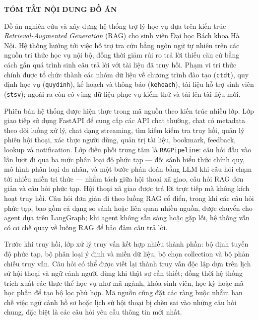 \documentclass[../DoAn.tex]{subfiles}
\begin{document}
\begin{center}
    \Large{\textbf{TÓM TẮT NỘI DUNG ĐỒ ÁN}}\\
\end{center}
\vspace{1cm}

Đồ án nghiên cứu và xây dựng hệ thống trợ lý học vụ dựa trên kiến trúc
\textit{Retrieval-Augmented Generation} (RAG) cho sinh viên Đại học Bách khoa
Hà Nội. Hệ thống hướng tới việc hỗ trợ tra cứu bằng ngôn ngữ tự nhiên trên các
nguồn tri thức học vụ nội bộ, đồng thời giảm rủi ro trả lời thiếu căn cứ bằng
cách gắn quá trình sinh câu trả lời với tài liệu đã truy hồi. Phạm vi tri thức
chính được tổ chức thành các nhóm dữ liệu về chương trình đào tạo
(\texttt{ctdt}), quy định học vụ (\texttt{quydinh}), kế hoạch và thông báo
(\texttt{kehoach}), tài liệu hỗ trợ sinh viên (\texttt{stsv}); ngoài ra còn có
vùng dữ liệu phục vụ kiểm thử và tải lên tài liệu mới.

Phiên bản hệ thống được hiện thực trong mã nguồn theo kiến trúc nhiều lớp. Lớp
giao tiếp sử dụng FastAPI để cung cấp các API chat thường, chat có metadata theo
dõi luồng xử lý, chat dạng streaming, tìm kiếm kiểm tra truy hồi, quản lý phiên
hội thoại, xác thực người dùng, quản trị tài liệu, bookmark, feedback, lookup và
notification. Lớp điều phối trung tâm là \texttt{RAGPipeline}: câu hỏi đầu vào
lần lượt đi qua ba mức phân loại độ phức tạp — đối sánh biểu thức chính quy, mô
hình phân loại đa nhãn, và một bước phán đoán bằng LLM khi câu hỏi chạm tới nhiều
miền tri thức — nhằm tách giữa hội thoại xã giao, câu hỏi RAG đơn giản và câu hỏi
phức tạp. Hội thoại xã giao được trả lời trực tiếp mà không kích hoạt truy hồi.
Câu hỏi đơn giản đi theo luồng RAG cổ điển, trong khi các câu hỏi phức tạp, bao
gồm cả dạng so sánh hoặc liên quan nhiều nguồn, được chuyển cho agent dựa trên
LangGraph; khi agent không sẵn sàng hoặc gặp lỗi, hệ thống vẫn có cơ chế quay về
luồng RAG để bảo đảm câu trả lời.

Trước khi truy hồi, lớp xử lý truy vấn kết hợp nhiều thành phần: bộ định tuyến
độ phức tạp, bộ phân loại ý định và miền dữ liệu, bộ chọn collection và bộ phản
chiếu truy vấn. Câu hỏi có thể được viết lại thành truy
vấn độc lập dựa trên lịch sử hội thoại và ngữ cảnh người dùng khi thật sự cần
thiết; đồng thời hệ thống trích xuất các thực thể học vụ như mã ngành, khóa sinh
viên, học kỳ hoặc mã học phần để tạo bộ lọc phù hợp. Mã nguồn cũng đặt các ràng
buộc nhằm hạn chế việc ngữ cảnh hồ sơ hoặc lịch sử hội thoại bị chèn sai vào
những câu hỏi chung, đặc biệt là các câu hỏi yêu cầu thông tin mới nhất.
\end{document}
